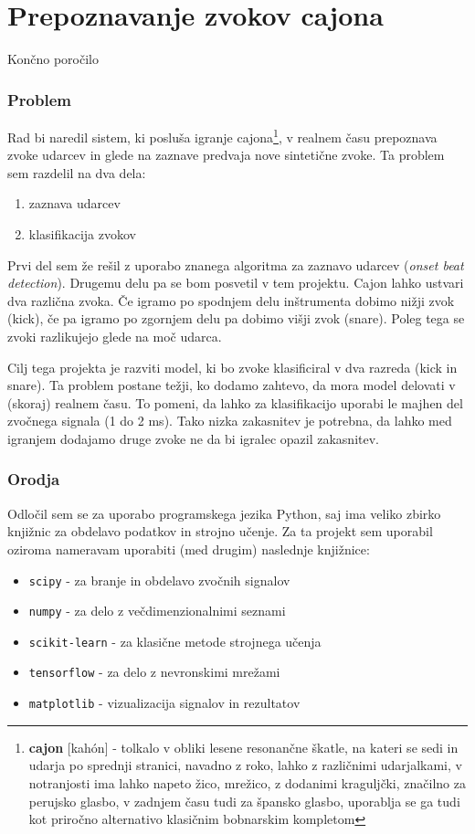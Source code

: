 \documentclass[11pt,a4paper]{article}
\begin{document}
\part*{Prepoznavanje zvokov cajona}
{\Large Končno poročilo}

\section{Problem}
Rad bi naredil sistem, ki posluša igranje cajona\footnote{\textbf{cajon} [kahón] - tolkalo v obliki lesene resonančne škatle, na kateri se sedi in udarja po sprednji stranici, navadno z roko, lahko z različnimi udarjalkami, v notranjosti ima lahko napeto žico, mrežico, z dodanimi kraguljčki, značilno za perujsko glasbo, v zadnjem času tudi za špansko glasbo, uporablja se ga tudi kot priročno alternativo klasičnim bobnarskim kompletom}, v realnem času prepoznava zvoke udarcev in glede na zaznave predvaja nove sintetične zvoke. Ta problem sem razdelil na dva dela:
\begin{enumerate}
    \item zaznava udarcev
    \item klasifikacija zvokov
\end{enumerate}
Prvi del sem že rešil z uporabo znanega algoritma za zaznavo udarcev (\emph{onset beat detection}). Drugemu delu pa se bom posvetil v tem projektu. Cajon lahko ustvari dva različna zvoka. Če igramo po spodnjem delu inštrumenta dobimo nižji zvok (kick), če pa igramo po zgornjem delu pa dobimo višji zvok (snare). Poleg tega se zvoki razlikujejo glede na moč udarca. 

Cilj tega projekta je razviti model, ki bo zvoke klasificiral v dva razreda (kick in snare). Ta problem postane težji, ko dodamo zahtevo, da mora model delovati v (skoraj) realnem času. To pomeni, da lahko za klasifikacijo uporabi le majhen del zvočnega signala (1 do 2 ms). Tako nizka zakasnitev je potrebna, da lahko med igranjem dodajamo druge zvoke ne da bi igralec opazil zakasnitev.


\section{Orodja}
Odločil sem se za uporabo programskega jezika Python, saj ima veliko zbirko knjižnic za obdelavo podatkov in strojno učenje. Za ta projekt sem uporabil oziroma nameravam uporabiti (med drugim) naslednje knjižnice: 
\begin{itemize}
    \item \texttt{scipy} - za branje in obdelavo zvočnih signalov
    \item \texttt{numpy} - za delo z večdimenzionalnimi seznami
    \item \texttt{scikit-learn} - za klasične metode strojnega učenja
    \item \texttt{tensorflow} - za delo z nevronskimi mrežami
    \item \texttt{matplotlib} - vizualizacija signalov in rezultatov
\end{itemize}
\end{document}
